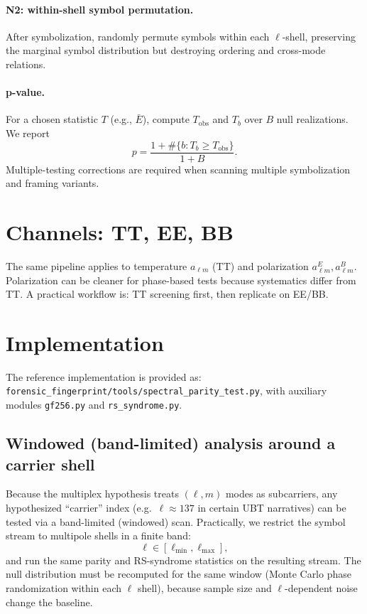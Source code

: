 \documentclass[11pt]{article}
\begin{document}
\paragraph{N2: within-shell symbol permutation.}
After symbolization, randomly permute symbols within each $\ell$-shell, preserving the marginal symbol distribution but
destroying ordering and cross-mode relations.

\paragraph{p-value.}
For a chosen statistic $T$ (e.g., $\bar E$), compute $T_{\mathrm{obs}}$ and $T_b$ over $B$ null realizations.
We report
\begin{equation}
  p = \frac{1+\#\{b:T_b\ge T_{\mathrm{obs}}\}}{1+B}.
\end{equation}
Multiple-testing corrections are required when scanning multiple symbolization and framing variants.

\section{Channels: TT, EE, BB}
The same pipeline applies to temperature $a_{\ell m}$ (TT) and polarization $a^{E}_{\ell m},a^{B}_{\ell m}$.
Polarization can be cleaner for phase-based tests because systematics differ from TT.
A practical workflow is: TT screening first, then replicate on EE/BB.

\section{Implementation}
The reference implementation is provided as:
\texttt{forensic\_fingerprint/tools/spectral\_parity\_test.py}, with auxiliary modules
\texttt{gf256.py} and \texttt{rs\_syndrome.py}.




\subsection{Windowed (band-limited) analysis around a carrier shell}
\label{sec:windowed}

Because the multiplex hypothesis treats $(\ell,m)$ modes as subcarriers, any hypothesized ``carrier'' index (e.g.\ $\ell\approx 137$ in certain UBT narratives) can be tested via a band-limited (windowed) scan. Practically, we restrict the symbol stream to multipole shells in a finite band:
\begin{equation}
  \ell \in [\ell_{\min}, \ell_{\max}],
\end{equation}
and run the same parity and RS-syndrome statistics on the resulting stream. The null distribution must be recomputed for the same window (Monte Carlo phase randomization within each $\ell$ shell), because sample size and $\ell$-dependent noise change the baseline.
\end{document}
